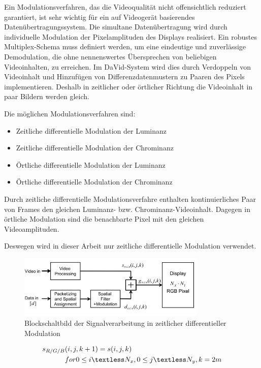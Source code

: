 Ein Modulationsverfahren, das die Videoqualität nicht offensichtlich reduziert garantiert, ist sehr wichtig für ein auf Videogerät basierendes Datenübertragungssystem. Die simultane Datenübertragung wird durch individuelle Modulation der Pixelamplituden des Displays realisiert. Ein robustes Multiplex-Schema muss definiert werden, um eine eindeutige und zuverlässige Demodulation, die ohne nennenswertes Übersprechen von beliebigen Videoinhalten, zu erreichen. Im DaVid-System wird dies durch Verdoppeln von Videoinhalt und Hinzufügen von Differenzdatenmustern zu Paaren des Pixels implementieren. Deshalb in zeitlicher oder örtlicher Richtung die Videoinhalt in paar Bildern werden gleich.


Die möglichen Modulationsverfahren sind:
\begin{itemize}
	\item Zeitliche differentielle Modulation der Luminanz
	\item Zeitliche differentielle Modulation der Chrominanz
	\item Örtliche differentielle Modulation der Luminanz
	\item Örtliche differentielle Modulation der Chrominanz
\end{itemize}

Durch zeitliche differentielle Modulationsverfahre enthalten kontinuierliches Paar von Frames den gleichen Luminanz- bzw. Chrominanz-Videoinhalt. Dagegen in örtliche Modulation sind die benachbarte Pixel mit den gleichen Videoamplituden.


Deswegen wird in dieser Arbeit nur zeitliche differentielle Modulation verwendet.

\begin{figure}[htb]
	\centering 
	\includegraphics[keepaspectratio,width=0.8\textwidth]{images/David2.jpg}
	\caption{Blockschaltbild der Signalverarbeitung in zeitlicher differentieller Modulation}
	\label{fig:David1}
\end{figure}




\begin{equation}
\begin{split}
s_{R/G/B}&(i,j,k+1) = s(i,j,k)\\
&for  0\le i \textless N_x, 0\le j \textless N_y,k=2m
\end{split}
\end{equation}

